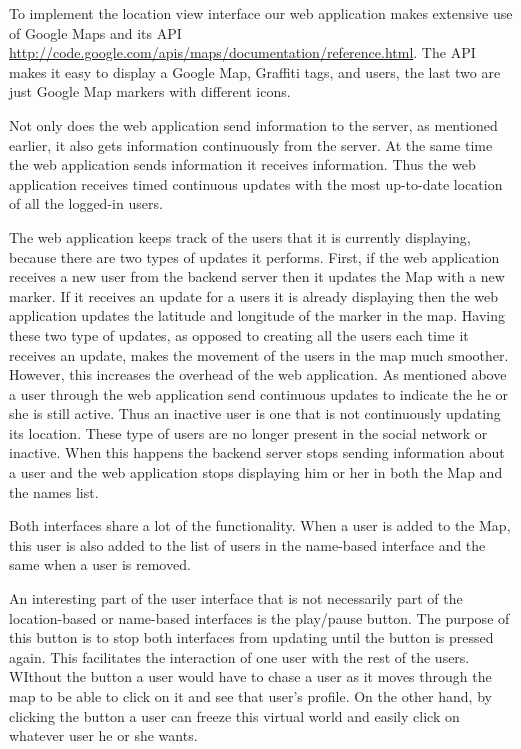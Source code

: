 \documentclass[11pt]{article}
\begin{document}
To implement the location view interface our web application makes extensive use of Google Maps and its API \url{http://code.google.com/apis/maps/documentation/reference.html}.  The API makes it easy to display a Google Map, Graffiti tags, and users, the last two are just Google Map markers with different icons.

Not only does the web application send information to the server, as mentioned earlier, it also gets information continuously from the server. At the same time the web application sends information it receives information. Thus the web application receives timed continuous updates with the most up-to-date location of all the logged-in users. 

The web application keeps track of the users that it is currently displaying, because there are two types of updates it performs. First, if the web application receives a new user from the  backend server then it updates the Map with a new marker. If it receives an update for a users it is already displaying then the web application updates the latitude and longitude of the marker in the map. Having these two type of updates, as opposed to creating all the users each time it receives an update,  makes the movement of the users in the map much smoother. However, this increases the overhead of the web application. As mentioned above a user through the web application send continuous updates to indicate the he or she is still active. Thus an inactive user is one that is not continuously updating its location. These type of users are no longer present in the social network or inactive. When this happens the backend server stops sending information about a user and the web application stops displaying him or her in both the Map and the names list.

Both interfaces share a lot of the functionality. When a user is added to the Map, this user is also added to the list of users in the name-based interface and the same when a user is removed.

An interesting part of the user interface that is not necessarily part of the location-based or name-based interfaces is the play/pause button. The purpose of this button is to stop both interfaces from updating until the button is pressed again. This facilitates the interaction of one user with the rest of the users. WIthout the button a user would have to chase a user as it moves through the map to be able to click on it and see that user's profile. On the other hand, by clicking the button a user can freeze this virtual world and easily click on whatever user he or she wants.
\end{document}

